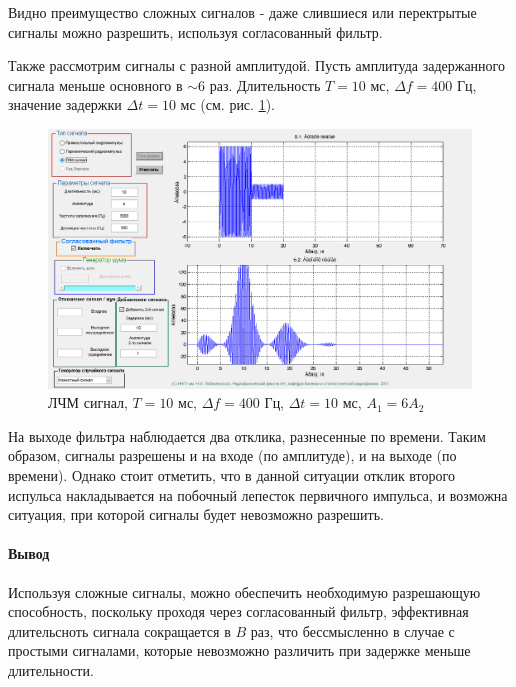 Видно преимущество сложных сигналов - даже слившиеся или перектрытые сигналы можно разрешить,
используя согласованный фильтр.

Также рассмотрим сигналы с разной амплитудой. Пусть амплитуда задержанного сигнала меньше основного в $\sim 6$ раз.
Длительность $T=10$ мс, $\Delta f=400$ Гц, значение задержки $\Delta t = 10$ мс (см. рис. \ref{fig:t5s21_dur10_del10_dev400_amp6}).
\begin{figure}[H]
    \centering
    \includegraphics[width=0.6\linewidth]{imgs/task5/lfm_dev400/6amp/t5s21_dur10_del10_dev400_amp6.png}
    \caption{ЛЧМ сигнал, $T=10$ мс, $\Delta f=400$ Гц, $\Delta t=10$ мс, $A_1 = 6A_2$}
    \label{fig:t5s21_dur10_del10_dev400_amp6}
\end{figure}
На выходе фильтра наблюдается два отклика, разнесенные по времени. Таким образом, сигналы разрешены и на входе (по
амплитуде), и на выходе (по времени). Однако стоит отметить, что в данной ситуации отклик второго испульса накладывается
на побочный лепесток первичного импульса, и возможна ситуация, при которой сигналы будет невозможно разрешить.

\paragraph{Вывод}
Используя сложные сигналы, можно обеспечить необходимую разрешающую способность, поскольку проходя через согласованный
фильтр, эффективная длительсноть сигнала сокращается в $B$ раз, что бессмысленно в случае с простыми сигналами, которые
невозможно различить при задержке меньше длительности.
